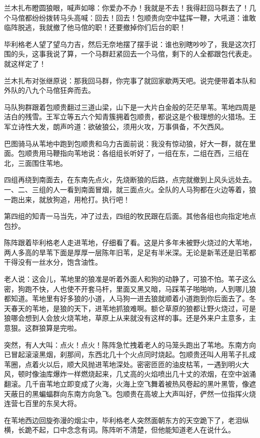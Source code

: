 \par 兰木扎布瞪圆狼眼，喊声如嗥：你爱办不办！我就是不去！我得赶回马群去了！几个马倌都纷纷拨转马头高喊：回去！回去！包顺贵向空中猛挥一鞭，大吼道：谁敢临阵脱逃，我就撤了他马倌的职！还要撤掉你们后台的职！
\par 毕利格老人望了望乌力吉，然后无奈地摆了摆手说：谁也别瞎吵吵了，我是这次打围的头，这事我说了算，一个马群赶紧回去一个马倌，剩下的人全都跟包代表走。就这样定了！
\par 兰木扎布对张继原说：那我回马群，你完事了就回家歇两天吧。说完便带着本队和外队的八九个马倌狂奔而去。
\par 
\par 马队狗群跟着包顺贵翻过三道山梁，山下是一大片白金般的茫茫旱苇。苇地四周是洁白的残雪。王军立等五六个知青簇拥着包顺贵，都说这是个极理想的火猎场。王军立诗性大发，朗声吟道：欲破狼公，须用火攻，万事俱备，不欠西风。
\par 巴图骑马从苇地中跑到包顺贵和乌力吉面前说：我没有惊动狼，好大一群，就在里面。包顺贵用马鞭指向苇地说：各组组长听好了，一组在东，二组在西，三组在北，三面围住苇地。
\par 四组再绕到南面去，在东南先点火，先烧断狼的后路，点完就撤到上风头远处去。一、二、三组的人一看到南面冒烟，就三面点火。全队的人马狗都在火边等着，狼一跑出来，就放狗追，用枪打。执行吧！
\par 第四组的知青一马当先，冲了过去，四组的牧民跟在后面。其他各组也向指定地点包抄。
\par 陈阵跟着毕利格老人走进苇地，仔细看了看。这是片多年未被野火烧过的大苇地，两人多高的旱苇下面是厚厚一层陈年旧苇，足足有半米深。无论是新苇还是旧苇都干得没有一丝水分，饱含油性。
\par 老人说：这会儿，苇地里的狼准是听着外面人和狗的动静了，可狼不怕。苇子这么密，狗跑不快，人也使不开套马杆，里面又黑又暗，马踩苇子啪啪响，人到哪儿狼都知道。苇地里有好多狼的小道，人马狗一进去狼就顺着小道跑到你后面去了。冬天春天的苇地，是狼的天下，进苇地抓狼难啊。额仑草原的狼都让野火烧过，可是狼哪会想到人会放火烧苇地，草原上从来就没有这样的事。还是外来户主意多，主意狠。这群狼算是完啦。
\par 突然，有人大叫：点火！点火！陈阵急忙拽着老人的马笼头跑出了苇地。东南方向已冒起滚滚黑烟，刹那间，东西北几十个火点同时烧起。包顺贵还叫人用苇子扎成苇圈，点着火以后，顺大风抛进苇地深处。密密匝匝的油皮枯苇，一遇到明火大风，顿时像油库爆炸一样燃烧起来，几丈高的火焰喷出几十丈的浓烟，在空中汹涌翻滚。几千亩苇地立即变成了火海，火海上空飞舞着被热风卷起的黑叶黑管，像遮天蔽日的黑蝙蝠群向东南方向急飞。包顺贵在高坡上大声叫好，俨然一位指挥火烧连营七百里的东吴大将。
\par 在苇地西边回旋弥漫的烟尘中，毕利格老人突然面朝东方的天空跪下了，老泪纵横，长跪不起，口中念念有词。陈阵听不清楚，但他能知道老人在说什么。

